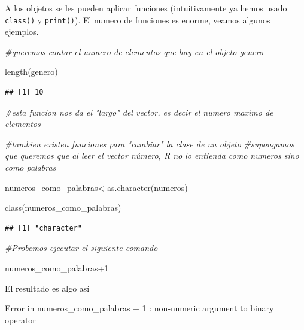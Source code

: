 \documentclass[
]{book}
\newenvironment{Shaded}{\begin{snugshade}}{\end{snugshade}}
\newcommand{\CommentTok}[1]{\textcolor[rgb]{0.56,0.35,0.01}{\textit{#1}}}
\newcommand{\DecValTok}[1]{\textcolor[rgb]{0.00,0.00,0.81}{#1}}
\newcommand{\FunctionTok}[1]{\textcolor[rgb]{0.00,0.00,0.00}{#1}}
\newcommand{\NormalTok}[1]{#1}
\newcommand{\OtherTok}[1]{\textcolor[rgb]{0.56,0.35,0.01}{#1}}
\newcommand{\SpecialCharTok}[1]{\textcolor[rgb]{0.00,0.00,0.00}{#1}}
\begin{document}
A los objetos se les pueden aplicar funciones (intuitivamente ya hemos usado \texttt{class()} y \texttt{print()}). El numero de funciones es enorme, veamos algunos ejemplos.

\begin{Shaded}
\begin{Highlighting}[]
\CommentTok{\#queremos contar el numero de elementos que hay en el objeto genero}

\FunctionTok{length}\NormalTok{(genero)}
\end{Highlighting}
\end{Shaded}

\begin{verbatim}
## [1] 10
\end{verbatim}

\begin{Shaded}
\begin{Highlighting}[]
\CommentTok{\#esta funcion nos da el "largo" del vector, es decir el numero maximo de elementos}
\end{Highlighting}
\end{Shaded}

\begin{Shaded}
\begin{Highlighting}[]
\CommentTok{\#tambien existen funciones para "cambiar" la clase de un objeto}
\CommentTok{\#supongamos que queremos que al leer el vector número, R no lo entienda como numeros sino como palabras}

\NormalTok{numeros\_como\_palabras}\OtherTok{\textless{}{-}}\FunctionTok{as.character}\NormalTok{(numeros)}

\FunctionTok{class}\NormalTok{(numeros\_como\_palabras)}
\end{Highlighting}
\end{Shaded}

\begin{verbatim}
## [1] "character"
\end{verbatim}

\begin{Shaded}
\begin{Highlighting}[]
\CommentTok{\#Probemos ejecutar el siguiente comando }

\NormalTok{numeros\_como\_palabras}\SpecialCharTok{+}\DecValTok{1}
\end{Highlighting}
\end{Shaded}

El resultado es algo así

Error in numeros\_como\_palabras + 1 :
non-numeric argument to binary operator
\end{document}
